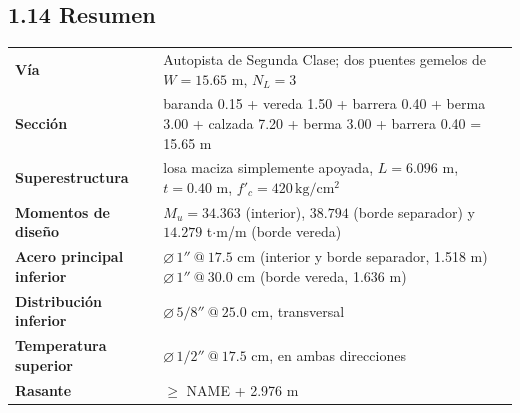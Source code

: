 \documentclass[11pt,a4paper]{article}
\newcommand{\uKg}{\,\mathrm{kg/cm^2}}
\begin{document}
\subsection*{1.14 Resumen}
\begin{resultado}
\begin{tabularx}{\linewidth}{@{}>{\bfseries}lX@{}}
Vía & Autopista de Segunda Clase; dos puentes gemelos de $W = 15.65$ m, $N_L = 3$\\
Sección & baranda 0.15 + vereda 1.50 + barrera 0.40 + berma 3.00 + calzada 7.20
 + berma 3.00 + barrera 0.40 = 15.65 m\\
Superestructura & losa maciza simplemente apoyada, $L = 6.096$ m, $t = 0.40$ m, $f'_c = 420\uKg$\\
Momentos de diseño & $M_u = 34.363$ (interior), $38.794$ (borde separador) y $14.279$ t$\cdot$m/m (borde vereda)\\
Acero principal inferior & $\varnothing\,1''\ @\ 17.5$ cm (interior y borde separador, 1.518 m)
 \quad $\varnothing\,1''\ @\ 30.0$ cm (borde vereda, 1.636 m)\\
Distribución inferior & $\varnothing\,5/8''\ @\ 25.0$ cm, transversal\\
Temperatura superior & $\varnothing\,1/2''\ @\ 17.5$ cm, en ambas direcciones\\
Rasante & $\ge$ NAME + 2.976 m
\end{tabularx}
\end{resultado}
\end{document}
